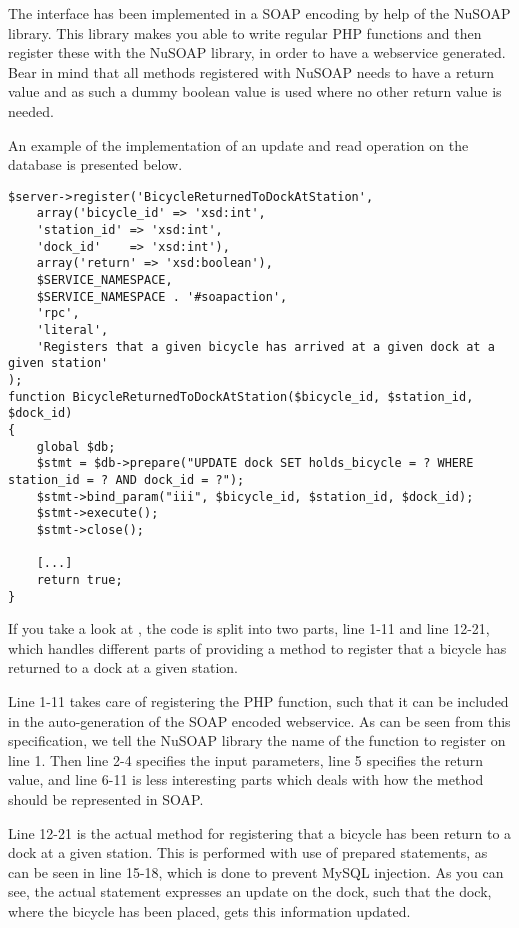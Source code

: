 The interface has been implemented in a SOAP encoding by help of the NuSOAP library.
This library makes you able to write regular PHP functions and then register these with the NuSOAP library, in order to have a webservice generated.
Bear in mind that all methods registered with NuSOAP needs to have a return value and as such a dummy boolean value is used where no other return value is needed.

An example of the implementation of an update and read operation on the database is presented below.

\begin{minipage}{\textwidth}
\begin{lstlisting}[caption = {Method for registering a bicycle as been returned to a dock at a given station.}, label = {lst:bicycledockstationreturned}]
$server->register('BicycleReturnedToDockAtStation',
	array('bicycle_id' => 'xsd:int',
	'station_id' => 'xsd:int',
	'dock_id'    => 'xsd:int'),
	array('return' => 'xsd:boolean'),
	$SERVICE_NAMESPACE,
	$SERVICE_NAMESPACE . '#soapaction',
	'rpc',
	'literal',
	'Registers that a given bicycle has arrived at a given dock at a given station'
);
function BicycleReturnedToDockAtStation($bicycle_id, $station_id, $dock_id)
{
	global $db;
	$stmt = $db->prepare("UPDATE dock SET holds_bicycle = ? WHERE station_id = ? AND dock_id = ?");
	$stmt->bind_param("iii", $bicycle_id, $station_id, $dock_id);
	$stmt->execute();
	$stmt->close();
	
	[...]
	return true;
}
\end{lstlisting}
\end{minipage}

If you take a look at , the code is split into two parts, line 1-11 and line 12-21, which handles different parts of providing a method to register that a bicycle has returned to a dock at a given station.

Line 1-11 takes care of registering the PHP function, such that it can be included in the auto-generation of the SOAP encoded webservice.
As can be seen from this specification, we tell the NuSOAP library the name of the function to register on line 1.
Then line 2-4 specifies the input parameters, line 5 specifies the return value, and line 6-11 is less interesting parts which deals with how the method should be represented in SOAP.

Line 12-21 is the actual method for registering that a bicycle has been return to a dock at a given station.
This is performed with use of prepared statements, as can be seen in line 15-18, which is done to prevent MySQL injection.
As you can see, the actual statement expresses an update on the dock, such that the dock, where the bicycle has been placed, gets this information updated.

